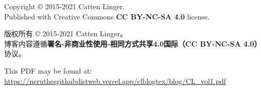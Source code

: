 \documentclass[11pt,a4paper]{report}
\date{2015-2019}
\newcommand{\volid}[0]{1}
\begin{document}
\begin{titlepage}
	\maketitle
\end{titlepage}

\tableofcontents
\clearpage












\cleardoublepage
\pagestyle{empty}
\hspace{1pt}
\vfill
{}\small

Copyright \copyright{} 2015-2021 Catten Linger.\\
Published with Creative Commons \textbf{CC BY-NC-SA 4.0} license.

版权所有 \copyright{} 2015-2021 Catten Linger。\\
博客内容遵循\textbf{署名-非商业性使用-相同方式共享4.0国际（CC BY-NC-SA 4.0）}协议。

This PDF may be found at:\\
\href{https://neruthesgithubdistweb.vercel.app/clblogtex/blog/CL\_vol\volid.pdf}{\ttfamily\footnotesize https://neruthesgithubdistweb.vercel.app/clblogtex/blog/CL\_vol\volid{}.pdf}
\end{document}
